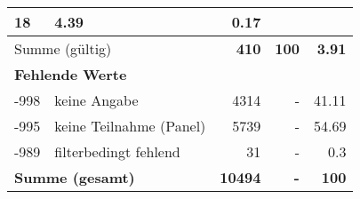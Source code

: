 \begin{longtable}{lXrrr}
       \num{18} &
       \num[round-mode=places,round-precision=2]{4.39} &
         \num[round-mode=places,round-precision=2]{0.17} \\
     \midrule
     \multicolumn{2}{l}{Summe (gültig)} &
       \textbf{\num{410}} &
     \textbf{\num{100}} &
       \textbf{\num[round-mode=places,round-precision=2]{3.91}} \\
     \multicolumn{5}{l}{\textbf{Fehlende Werte}}\\
       -998 &
       keine Angabe &
         \num{4314} &
        - &
         \num[round-mode=places,round-precision=2]{41.11} \\
       -995 &
       keine Teilnahme (Panel) &
         \num{5739} &
        - &
         \num[round-mode=places,round-precision=2]{54.69} \\
       -989 &
       filterbedingt fehlend &
         \num{31} &
        - &
         \num[round-mode=places,round-precision=2]{0.3} \\
     \midrule
     \multicolumn{2}{l}{\textbf{Summe (gesamt)}} &
          \textbf{\num{10494}} &
        \textbf{-} &
        \textbf{\num{100}} \\
     \bottomrule
     \end{longtable}
     
